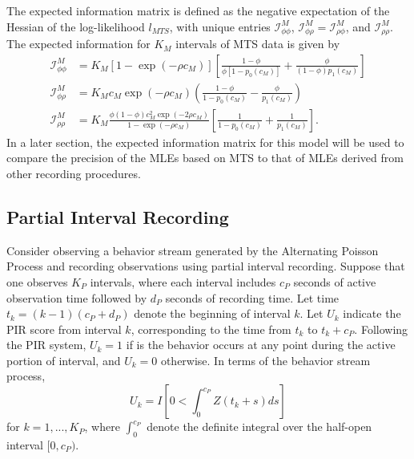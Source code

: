 \documentclass[man, noextraspace, floatsintext]{apa6}\usepackage[]{graphicx}\usepackage[]{color}
\newcommand{\info}{\mathcal{I}}
\begin{document}
The expected information matrix is defined as the negative expectation of the Hessian of the log-likelihood $l_{MTS}$, with unique entries $\info^{M}_{\phi\phi}$, $\info^{M}_{\phi\rho} = \info^{M}_{\rho\phi}$, and $\info^{M}_{\rho\rho}$.
The expected information for $K_M$ intervals of MTS data is given by  
\begin{equation}
\label{eq:MTS_Info}
\begin{aligned}
\info^{M}_{\phi\phi} &= K_M \left[1 - \exp\left(-\rho c_M\right)\right]\left[ \frac{1 - \phi}{\phi \left[1 - p_0(c_M)\right]} + \frac{\phi}{(1 - \phi)p_1(c_M)}\right] \\ 
\info^{M}_{\phi\rho} &= K_M c_M \exp(-  \rho c_M) \left(\frac{1 - \phi}{1 - p_0(c_M)} - \frac{\phi}{p_1(c_M)}\right)\\
\info^{M}_{\rho\rho} &= K_M \frac{\phi(1 - \phi)c_M^2 \exp(-2\rho c_M)}{1 - \exp(-\rho c_M)}\left[\frac{1}{1 - p_0(c_M)} + \frac{1}{p_1(c_M)}\right].
\end{aligned}
\end{equation}
In a later section, the expected information matrix for this model will be used to compare the precision of the MLEs based on MTS to that of MLEs derived from other recording procedures. 

\subsection{Partial Interval Recording}
\label{subsec:PIR}

Consider observing a behavior stream generated by the Alternating Poisson Process and recording observations using partial interval recording. 
Suppose that one observes $K_P$ intervals, where each interval includes $c_P$ seconds of active observation time followed by $d_P$ seconds of recording time. 
Let time $t_k = (k-1)(c_P + d_P)$ denote the beginning of interval $k$. Let $U_k$ indicate the PIR score from interval $k$, corresponding to the time from $t_k$ to $t_k + c_P$. 
Following the PIR system, $U_k = 1$ if is the behavior occurs at any point during the active portion of interval, and $U_k = 0$ otherwise. 
In terms of the behavior stream process, 
\begin{equation}
U_k = I\left[ 0 < \int_0^{c_P} Z\left(t_k + s \right) ds\right]
\end{equation}
for $k = 1,...,K_P$, where $\int_0^{c_P}$ denote the definite integral over the half-open interval $[0,c_P)$.
\end{document}
